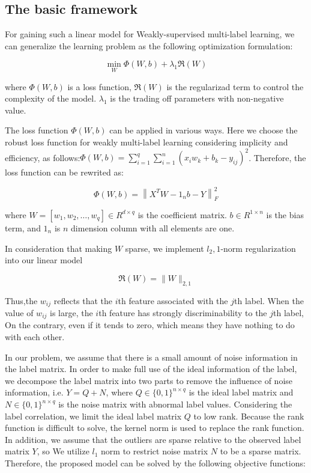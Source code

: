\documentclass[final,3p,times]{elsarticle}
\begin{document}
\subsection{The basic framework}
For gaining such a linear model for Weakly-supervised multi-label learning, we can generalize the learning problem as the following optimization formulation:


\begin{equation}
\min _{W} \Phi(W, b)+\lambda_{1}\Re(W)
\end{equation}


\noindent where $\Phi(W, b)$ is a loss function, $\Re(W)$ is the regularizad term to control the complexity of the model. $\lambda_{1}$ is the trading off parameters with non-negative value.

The loss function $\Phi(W, b)$ can be applied in various ways. Here we choose the robust loss function for weakly multi-label learning considering implicity and efficiency, as follows:$\Phi(W, b)=\sum_{i=1}^{q} \sum_{i=1}^{n}\left(x_{i} w_{k}+b_{k}-y_{i j}\right)^{2}$. Therefore, the loss function can be rewrited as:


\begin{equation}
	\Phi(W, b)=\left\|X^{T} W-1_{n} b-Y\right\|_{F}^{2}
\end{equation}


\noindent where $W=\left[w_{1}, w_{2}, \ldots, w_{q}\right] \in R^{d \times q}$ is the coefficient matrix. $b \in R^{1 \times n}$ is the bias term, and $1_n$ is $n$ dimension column with all elements are one.

In consideration that making $W$ sparse, we implement $l_2,1$-norm regularization into our linear model


\begin{equation}
	\Re(W)=\|W\|_{2,1}
\end{equation}


Thus,the $w_{ij}$ reflects that the $i$th feature associated with the $j$th label. When the value of $w_{ij}$ is large, the $i$th feature has strongly discriminability to the $j$th label, On the contrary, even if it tends to zero, which means they have nothing to do with each other.

In our problem, we assume that there is a small amount of noise information in the label matrix. In order to make full use of the ideal information of the label, we decompose the label matrix into two parts to remove the influence of noise information, i.e. $Y=Q+N$, where $Q \in\{0,1\}^{n \times q}$ is the ideal label matrix and $N \in\{0,1\}^{n \times q}$ is the noise matrix with abnormal label values. Considering the label correlation, we limit the ideal label matrix $Q$ to low rank. Because the rank function is difficult to solve, the kernel norm is used to replace the rank function. In addition, we assume that the outliers are sparse relative to the observed label matrix $Y$, so We utilize $l_{1}$ norm to restrict noise matrix $N$ to be a sparse matrix. Therefore, the proposed model can be solved by the following objective functions:
\end{document}
